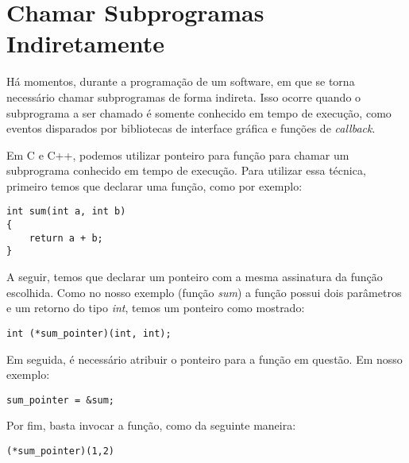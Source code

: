 \section{Chamar Subprogramas Indiretamente} %
\label{sec:chamar_subprogramas_indiretamente}
Há momentos, durante a programação de um software, em que se torna necessário chamar subprogramas de forma indireta. Isso ocorre quando o subprograma a ser chamado é somente conhecido em tempo de execução, como eventos disparados por bibliotecas de interface gráfica e funções de \textit{callback}.

Em C e C++, podemos utilizar ponteiro para função para chamar um subprograma conhecido em tempo de execução. Para utilizar essa técnica, primeiro temos que declarar uma função, como por exemplo:
\begin{verbatim}
int sum(int a, int b)
{
	return a + b;
}
\end{verbatim}

A seguir, temos que declarar um ponteiro com a mesma assinatura da função escolhida. Como no nosso exemplo (função \textit{sum}) a função possui dois parâmetros e um retorno do tipo \emph{int}, temos um ponteiro como mostrado:
\begin{verbatim}
int (*sum_pointer)(int, int);
\end{verbatim}

Em seguida, é necessário atribuir o ponteiro para a função em questão. Em nosso exemplo:
\begin{verbatim}
sum_pointer = &sum;
\end{verbatim}

Por fim, basta invocar a função, como da seguinte maneira:
\begin{verbatim}
(*sum_pointer)(1,2)	
\end{verbatim}

